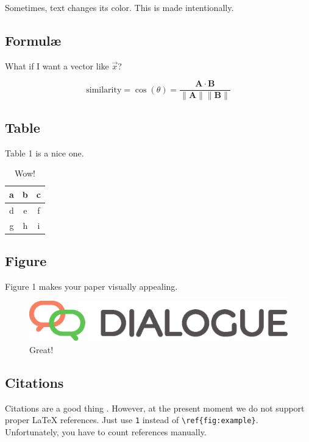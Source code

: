 \documentclass{dialogue}
\begin{document}
Sometimes, text changes its color. This is made intentionally.

\subsection{Formul\ae}

What if I want a vector like $\vec{x}$?

\begin{equation}
  \text{similarity} = \cos(\theta) = \frac{\mathbf{A} \cdot \mathbf{B}}{\|\mathbf{A}\| \|\mathbf{B}\|}
\end{equation}

\subsection{Table}

Table 1 is a nice one.

\begin{table}[htbp]
\centering
\caption{Wow!}
\begin{tabular}{|c|c|c|}\hline
a & b & c \\\hline
d & e & f \\\hline
g & h & i \\\hline
\end{tabular}
\end{table}

\subsection{Figure}

Figure 1 makes your paper visually appealing.

\begin{figure}[htbp]
\centering
\includegraphics[scale=.4]{dialogue.eps}
\caption{Great!}
\end{figure}

\subsection{Citations}

Citations are a good thing \cite{Panchenko:18,Sharoff:11}. However, at the present moment we do not support proper {\LaTeX} references. Just use \verb|1| instead of \verb|\ref{fig:example}|. Unfortunately, you have to count references manually.
\end{document}
